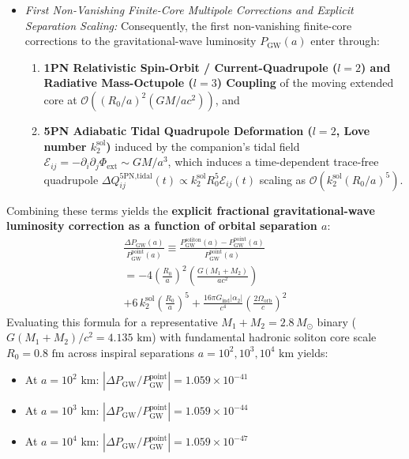 \documentclass[10pt,aps,prd,twocolumn,superscriptaddress,nofootinbib,floatfix,longbibliography,showkeys]{revtex4-2}
\begin{document}
\begin{enumerate}
\begin{itemize}
    \item \textit{First Non-Vanishing Finite-Core Multipole Corrections and Explicit Separation Scaling:} Consequently, the first non-vanishing finite-core corrections to the gravitational-wave luminosity $P_{\text{GW}}(a)$ enter through:
    \begin{enumerate}
      \item \textbf{1PN Relativistic Spin-Orbit / Current-Quadrupole ($l=2$) and Radiative Mass-Octupole ($l=3$) Coupling} of the moving extended core at $\mathcal{O}\!\left((R_0/a)^2 (GM/ac^2)\right)$, and
      \item \textbf{5PN Adiabatic Tidal Quadrupole Deformation ($l=2$, Love number $k_2^{\text{sol}}$)} induced by the companion's tidal field $\mathcal{E}_{ij} = -\partial_i\partial_j\Phi_{\text{ext}} \sim G M / a^3$, which induces a time-dependent trace-free quadrupole $\Delta Q_{ij}^{\text{5PN,tidal}}(t) \propto k_2^{\text{sol}} R_0^5 \mathcal{E}_{ij}(t)$ scaling as $\mathcal{O}\!\left(k_2^{\text{sol}}(R_0/a)^5\right)$.

    \end{enumerate}
  \end{itemize}
  Combining these terms yields the \textbf{explicit fractional gravitational-wave luminosity correction as a function of orbital separation $a$}:
\begin{multline}
\frac{\Delta P_{\text{GW}}(a)}{P_{\text{GW}}^{\text{point}}(a)} \equiv \frac{P_{\text{GW}}^{\text{soliton}}(a) - P_{\text{GW}}^{\text{point}}(a)}{P_{\text{GW}}^{\text{point}}(a)} \\
= -4\left(\frac{R_0}{a}\right)^2\left(\frac{G(M_1 + M_2)}{a c^2}\right) \\
+ 6\,k_2^{\text{sol}}\left(\frac{R_0}{a}\right)^5 + \frac{16\pi G_{\text{ind}}|\alpha_2|}{c^4}\left(\frac{2\Omega_{\text{orb}}}{c}\right)^2
\end{multline}
  Evaluating this formula for a representative $M_1 + M_2 = 2.8\,M_\odot$ binary ($G(M_1+M_2)/c^2 = 4.135\text{ km}$) with fundamental hadronic soliton core scale $R_0 = 0.8\text{ fm}$ across inspiral separations $a = 10^2, 10^3, 10^4\text{ km}$ yields:
  \begin{itemize}
    \item At $a = 10^2\text{ km}$: $\left|\Delta P_{\text{GW}} / P_{\text{GW}}^{\text{point}}\right| = 1.059 \times 10^{-41}$
    \item At $a = 10^3\text{ km}$: $\left|\Delta P_{\text{GW}} / P_{\text{GW}}^{\text{point}}\right| = 1.059 \times 10^{-44}$
    \item At $a = 10^4\text{ km}$: $\left|\Delta P_{\text{GW}} / P_{\text{GW}}^{\text{point}}\right| = 1.059 \times 10^{-47}$


\end{itemize}
\end{enumerate}
\end{document}
